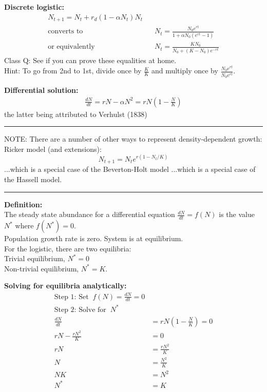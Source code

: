 \documentclass{article}
\newcommand{\note}[1]{\colorbox{gray!30}{#1}}
\newcommand{\ind}{\-\hspace{1cm}}
\begin{document}
\textbf{Discrete logistic:}\\
\begin{align*}
	N_{t+1}=N_t+r_d(1-\alpha N_t)N_t & \\ 
	\text{converts to}&
	\;\;\; N_t=\frac{N_0e^{rt}}{1+\alpha N_0 (e^{rt}-1)}\\
	\text{or equivalently}
	&\;\;\; N_t=\frac{K N_0}{N_0+(K-N_0)e^{-rt}}
\end{align*}
\note{Class Q:}  See if you can prove these equalities at home.\\
Hint: To go from 2nd to 1st, divide once by $\tfrac{K}{K}$ and multiply once by $\tfrac{N_0 e^{rt}}{N_0 e^{rt}}$.

\vspace{0.5cm}

\textbf{Differential solution:}
\begin{align*}
	\frac{dN}{dt}=rN-\alpha N^2=rN\left(1-\tfrac{N}{K}\right)
\end{align*}
the latter being attributed to Verhulst (1838)

\rule[0.5ex]{\linewidth}{1pt}

NOTE:  There are a number of other ways to represent density-dependent growth:\\
Ricker model (and extensions):
\begin{equation*}
	N_{t+1}=N_t e^{r(1-N_t /K)}
\end{equation*}
...which is a special case of the Beverton-Holt model
...which is a special case of the Hassell model.

\rule[0.5ex]{\linewidth}{1pt}

\pagebreak

\textbf{Definition:}\\
The steady state abundance for a differential equation $\frac{dN}{dt}=f(N)$ is the value $N^*$ where $f(N^*)=0$.\\
Population growth rate is zero.  System is at equilibrium.\\

For the logistic, there are two equilibria:\\
\ind Trivial equilibrium, $N^*=0$\\
\ind Non-trivial equilibrium, $N^*=K$.

\vspace{0.5cm}
\textbf{Solving for equilibria analytically:}
\begin{align*}
	\text{Step 1:  Set}\;\; f(N)=\frac{dN}{dt}=0&\\
	\text{Step 2:  Solve for}\;\;N^*&\\
	\frac{dN}{dt}&=rN\left(1-\frac{N}{K}\right)=0\\
	rN-\frac{rN^2}{K}&=0\\
	rN&=\frac{rN^2}{K}\\
	N&=\frac{N^2}{K}\\
	NK&=N^2\\
	N^*&=K
\end{align*}
\end{document}
